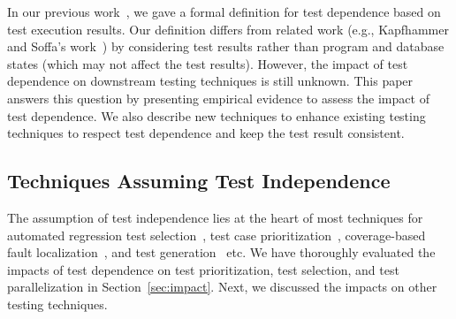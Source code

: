 In our previous work~\cite{testdependence}, we gave a formal definition
for test dependence based on test execution results.
Our definition differs from related work (e.g.,
Kapfhammer and Soffa's work~\cite{kapfhammeretal:FSE:2003}) by considering
test results rather than program and database states (which
may not affect the test results). 
%
However, the impact of test dependence on downstream
testing techniques is still unknown.
This paper answers this question by presenting
empirical evidence to assess the impact of
test dependence. We also describe new techniques
to enhance existing testing techniques to respect
test dependence and keep the test result consistent.

\subsection{Techniques Assuming Test Independence}
The assumption of test independence lies at the heart of most
techniques for automated regression test selection~\cite{harroldetal:OOPSLA:2001, Orso:2004:SRT,
Briand:2009:ART, Zhang:2012:RMT, Nanda:2011:RTP},
test case prioritization~\cite{Elbaum:2000:PTC:347324.348910, Kim:2002:HTP:581339.581357, Rummel:2005:TPR:1066677.1067016, Srivastava:2002:EPT:566172.566187, Jiang:2009:ART}, 
coverage-based fault localization~\cite{Steimann:2013, Zhang:2013:IMF, Jones:2002:VTI},
and test generation~\cite{PachecoLET2007, Wang:2007:AGC,
ZhangSBE2011} etc. 
We have thoroughly evaluated the impacts of test dependence
on test prioritization, test selection, and test parallelization
in Section~\ref{sec:impact}. Next, we discussed the impacts
on other testing techniques.


